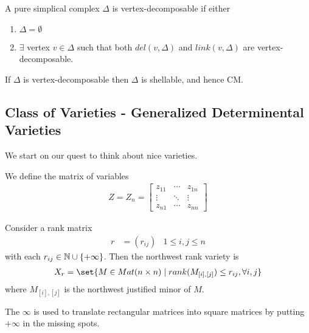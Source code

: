 \begin{definition}
    A pure simplical complex $\Delta$ is vertex-decomposable if either
    \begin{enumerate}
        \item $\Delta = \emptyset$
        \item $\exists$ vertex $v \in \Delta$ such that both $del(v, \Delta) $ and $link(v,\Delta)$ are vertex-decomposable.
    \end{enumerate}
\end{definition}

\begin{theorem}
    If $\Delta$ is vertex-decomposable then $\Delta$ is shellable, and hence CM.
\end{theorem}

\subsection{Class of Varieties - Generalized Determinental Varieties}



We start on our quest to think about nice varieties.

\begin{definition}
    We define the matrix of variables
    \begin{align*}
        Z = Z_n =
        \begin{bmatrix}
        z_{11} & \cdots & z_{1n}\\
        \vdots & \ddots & \vdots\\
        z_{n1} & \cdots & z_{nn}
        \end{bmatrix}
    \end{align*}
\end{definition}

\begin{definition}
    Consider a rank matrix
    \begin{align*}
        r &= (r_{ij}) &1 \leq i,j \leq n
    \end{align*}
    with each $r_{ij} \in \mathbb{N} \cup \{ + \infty \}$. Then the northwest rank variety is
    \begin{align*}
        X_r = \set{ M \in Mat(n \times n) \mid rank (M_{[i], [j] } ) \leq r_{ij}, \forall i,j }
    \end{align*}
    where $M_{[i], [j] }$ is the northwest justified minor of $M$.
\end{definition}
The $\infty$ is used to translate rectangular matrices into square matrices by putting $ + \infty$ in the missing spots.

